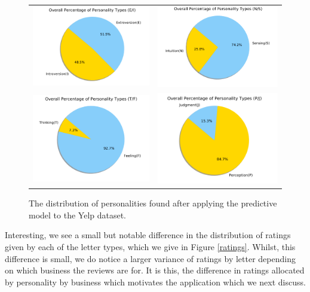 \documentclass[sigconf, nonacm]{acmart}
\begin{document}
\begin{center}
\begin{figure}
\begin{tabular}{ c c }
\includegraphics[width = 0.4\columnwidth]{E_I_Dist} & 
\includegraphics[width = 0.4\columnwidth]{N_S_Dist} \\
\includegraphics[width = 0.4\columnwidth]{T_F_Dist} & 
\includegraphics[width = 0.4\columnwidth]{P_J_Dist} 
\end{tabular}
\caption{The distribution of personalities found after applying the predictive model to the Yelp dataset.}
\label{distribution_personalities}
\end{figure}
\end{center}


Interesting, we see a small but notable difference in the distribution of ratings given by each of the letter types, which we give in Figure \ref{ratings}. Whilst, this difference is small, we do notice a larger variance of ratings by letter depending on which business the reviews are for. It is this, the difference in ratings allocated by personality by business which motivates the application which we next discuss.  \\
\end{document}
